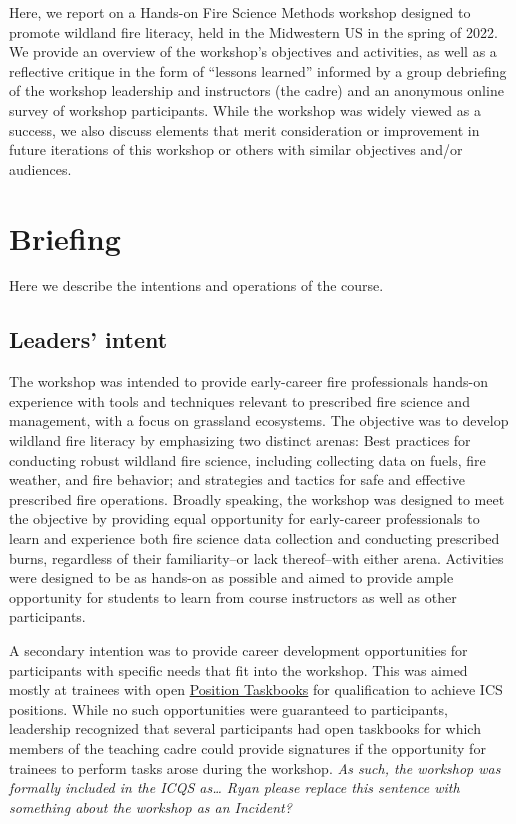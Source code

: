 \documentclass[fire,article,submit,moreauthors,pdftex]{Definitions/mdpi}
\begin{document}
Here, we report on a Hands-on Fire Science Methods workshop designed to promote wildland fire literacy, held in the Midwestern US in the spring of 2022.
We provide an overview of the workshop's objectives and activities, as well as a reflective critique in the form of ``lessons learned'' informed by a group debriefing of the workshop leadership and instructors (the cadre) and an anonymous online survey of workshop participants.
While the workshop was widely viewed as a success, we also discuss elements that merit consideration or improvement in future iterations of this workshop or others with similar objectives and/or audiences.

\section{Briefing} 

Here we describe the intentions and operations of the course.

\subsection{Leaders' intent}

The workshop was intended to provide early-career fire professionals hands-on experience with tools and techniques relevant to prescribed fire science and management, with a focus on grassland ecosystems.
The objective was to develop wildland fire literacy by emphasizing two distinct arenas: Best practices for conducting robust wildland fire science, including collecting data on fuels, fire weather, and fire behavior; and strategies and tactics for safe and effective prescribed fire operations.
Broadly speaking, the workshop was designed to meet the objective by providing equal opportunity for early-career professionals to learn and experience both fire science data collection and conducting prescribed burns, regardless of their familiarity--or lack thereof--with either arena.
Activities were designed to be as hands-on as possible and aimed to provide ample opportunity for students to learn from course instructors as well as other participants.

A secondary intention was to provide career development opportunities for participants with specific needs that fit into the workshop.
This was aimed mostly at trainees with open \href{https://www.nwcg.gov/publications/position-taskbooks/about}{Position Taskbooks} for qualification to achieve ICS positions.
While no such opportunities were guaranteed to participants, leadership recognized that several participants had open taskbooks for which members of the teaching cadre could provide signatures if the opportunity for trainees to perform tasks arose during the workshop.
\emph{As such, the workshop was formally included in the ICQS as\ldots{} Ryan please replace this sentence with something about the workshop as an Incident?}
\end{document}
